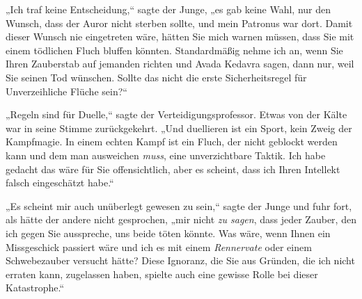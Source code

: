 „Ich traf keine Entscheidung,“ sagte der Junge, „es gab keine Wahl, nur den Wunsch, dass der Auror nicht sterben sollte, und mein Patronus war dort. Damit dieser Wunsch nie eingetreten wäre, hätten Sie mich warnen müssen, dass Sie mit einem tödlichen Fluch bluffen könnten. Standardmäßig nehme ich an, wenn Sie Ihren Zauberstab auf jemanden richten und Avada Kedavra sagen, dann nur, weil Sie seinen Tod wünschen. Sollte das nicht die erste Sicherheitsregel für Unverzeihliche Flüche sein?“

„Regeln sind für Duelle,“ sagte der Verteidigungsprofessor. Etwas von der Kälte war in seine Stimme zurückgekehrt. „Und duellieren ist ein Sport, kein Zweig der Kampfmagie. In einem echten Kampf ist ein Fluch, der nicht geblockt werden kann und dem man ausweichen \emph{muss}, eine unverzichtbare Taktik. Ich habe gedacht das wäre für Sie offensichtlich, aber es scheint, dass ich Ihren Intellekt falsch eingeschätzt habe.“

„Es scheint mir auch unüberlegt gewesen zu sein,“ sagte der Junge und fuhr fort, als hätte der andere nicht gesprochen, „mir nicht \emph{zu sagen}, dass jeder Zauber, den ich gegen Sie ausspreche, uns beide töten könnte. Was wäre, wenn Ihnen ein Missgeschick passiert wäre und ich es mit einem \emph{Rennervate} oder einem Schwebezauber versucht hätte? Diese Ignoranz, die Sie aus Gründen, die ich nicht erraten kann, zugelassen haben, spielte auch eine gewisse Rolle bei dieser Katastrophe.“

